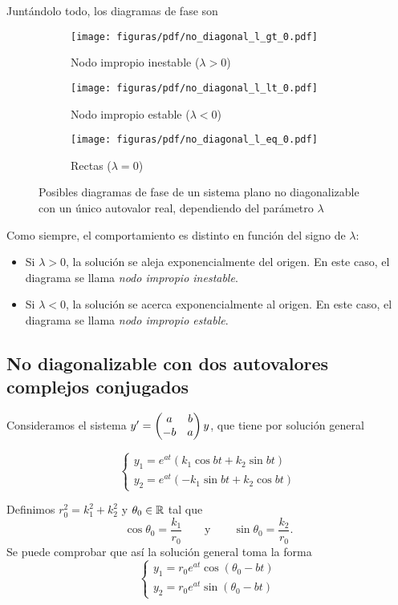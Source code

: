 \documentclass[../ecuaciones_diferenciales.tex]{subfiles}
\begin{document}
Juntándolo todo, los diagramas de fase son

\begin{figure}[ht]
	\centering
	\begin{subfigure}{0.33\textwidth}
		\centering
        \texttt{[image: figuras/pdf/no\_diagonal\_l\_gt\_0.pdf]}
		\caption*{Nodo impropio inestable (\(\lambda > 0\))}
	\end{subfigure}%
	\begin{subfigure}{0.33\textwidth}
		\centering
        \texttt{[image: figuras/pdf/no\_diagonal\_l\_lt\_0.pdf]}
		\caption*{Nodo impropio estable (\(\lambda < 0\))}
	\end{subfigure}%
	\begin{subfigure}{0.33\textwidth}
		\centering
        \texttt{[image: figuras/pdf/no\_diagonal\_l\_eq\_0.pdf]}
		\caption*{Rectas (\(\lambda = 0\))}
	\end{subfigure}
	\caption{Posibles diagramas de fase de un sistema plano no diagonalizable con 
	un único autovalor real, dependiendo del parámetro \(\lambda\)}
\end{figure}

Como siempre, el comportamiento es distinto en función del signo de \(\lambda\):

\begin{itemize}
	\item Si \(\lambda > 0\), la solución se aleja exponencialmente del origen. En
	      este caso, el diagrama se llama \emph{nodo impropio inestable}.
	\item Si \(\lambda < 0\), la solución se acerca exponencialmente al origen. En
	      este caso, el diagrama se llama \emph{nodo impropio estable}.
\end{itemize}

\subsection{No diagonalizable con dos autovalores complejos conjugados}
Consideramos el sistema \(y' = \begin{pmatrix}a & b \\ -b & a\end{pmatrix}y\), que tiene por solución
general

\[
	\begin{cases}
		y_1 = e^{at}(k_1 \cos bt + k_2 \sin bt) \\
		y_2 = e^{at}(-k_1 \sin bt + k_2 \cos bt)
	\end{cases}
\]

Definimos \(r_0^2 = k_1^2+k_2^2\) y \(\theta_0 \in \mathbb{R}\) tal que
\[\cos \theta_0 = \frac{k_1}{r_0} \qquad \text{y} \qquad \sin \theta_0 = \frac{k_2}{r_0}.\]
Se puede comprobar que así la solución general toma la forma
\[
	\begin{cases}
		y_1 = r_0e^{at} \cos (\theta_0 - bt) \\
		y_2 = r_0e^{at} \sin (\theta_0 - bt)
	\end{cases}
\]
\end{document}
